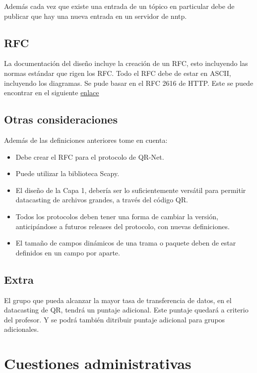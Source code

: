 \documentclass{article}
\providecommand{\tightlist}{%
          \setlength{\itemsep}{0pt}\setlength{\parskip}{0pt}}
\begin{document}
Además cada vez que existe una entrada de un tópico en particular debe
de publicar que hay una nueva entrada en un servidor de nntp.

\subsection{RFC}\label{rfc}

La documentación del diseño incluye la creación de un RFC, esto
incluyendo las normas estándar que rigen los RFC. Todo el RFC debe de
estar en ASCII, incluyendo los diagramas. Se pude basar en el RFC 2616
de HTTP. Este se puede encontrar en el siguiente
\href{http://www.w3.org/Protocols/rfc2616/rfc2616.txt}{enlace}

\subsection{Otras consideraciones}\label{otras-consideraciones}

Además de las definiciones anteriores tome en cuenta:

\begin{itemize}
\tightlist
\item
  Debe crear el RFC para el protocolo de QR-Net.
\item
  Puede utilizar la biblioteca Scapy.
\item
  El diseño de la Capa 1, debería ser lo suficientemente versátil para
  permitir datacasting de archivos grandes, a través del código QR.
\item
  Todos los protocolos deben tener una forma de cambiar la versión,
  anticipándose a futuros releases del protocolo, con nuevas
  definiciones.
\item
  El tamaño de campos dinámicos de una trama o paquete deben de estar
  definidos en un campo por aparte.
\end{itemize}

\subsection{Extra}\label{extra}

El grupo que pueda alcanzar la mayor tasa de transferencia de datos, en
el datacasting de QR, tendrá un puntaje adicional. Este puntaje quedará
a criterio del profesor. Y se podrá también ditribuir puntaje adicional
para grupos adicionales.

\section{Cuestiones administrativas}\label{administrativo}
\end{document}
